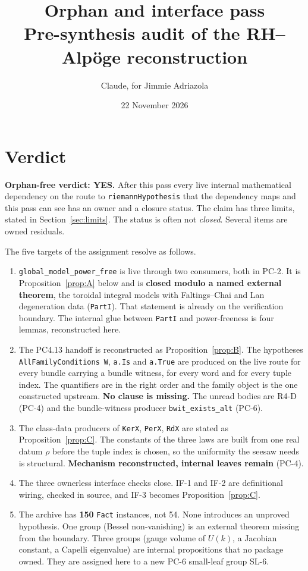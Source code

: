 \documentclass[11pt]{article}
\title{Orphan and interface pass\\[2pt]\large Pre-synthesis audit of the RH--Alpöge reconstruction}
\author{Claude, for Jimmie Adriazola}
\date{22 November 2026}
\newcommand{\lean}[1]{\nolinkurl{#1}}
\newcommand{\PC}[1]{PC-#1}
\theoremstyle{remark}
\begin{document}
\maketitle

\section{Verdict}

\textbf{Orphan-free verdict: YES.} After this pass every live internal mathematical dependency on the route to \lean{riemannHypothesis} that the dependency maps and this pass can see has an owner and a closure status. The claim has three limits, stated in Section~\ref{sec:limits}. The status is often not \emph{closed}. Several items are owned residuals.

The five targets of the assignment resolve as follows.
\begin{enumerate}
\item \lean{global_model_power_free} is live through two consumers, both in \PC{2}. It is Proposition~\ref{prop:A} below and is \textbf{closed modulo a named external theorem}, the toroidal integral models with Faltings--Chai and Lan degeneration data (\lean{PartI}). That statement is already on the verification boundary. The internal glue between \lean{PartI} and power-freeness is four lemmas, reconstructed here.
\item The PC4.13 handoff is reconstructed as Proposition~\ref{prop:B}. The hypotheses \lean{AllFamilyConditions}~\lean{W}, \lean{a.Is} and \lean{a.True} are produced on the live route for every bundle carrying a bundle witness, for every word and for every tuple index. The quantifiers are in the right order and the family object is the one constructed upstream. \textbf{No clause is missing.} The unread bodies are R4-D (\PC{4}) and the bundle-witness producer \lean{bwit_exists_alt} (\PC{6}).
\item The class-data producers of \lean{KerX}, \lean{PerX}, \lean{RdX} are stated as Proposition~\ref{prop:C}. The constants of the three laws are built from one real datum $\rho$ before the tuple index is chosen, so the uniformity the seesaw needs is structural. \textbf{Mechanism reconstructed, internal leaves remain} (\PC{4}).
\item The three ownerless interface checks close. IF-1 and IF-2 are definitional wiring, checked in source, and IF-3 becomes Proposition~\ref{prop:C}.
\item The archive has \textbf{150} \lean{Fact} instances, not 54. None introduces an unproved hypothesis. One group (Bessel non-vanishing) is an external theorem missing from the boundary. Three groups (gauge volume of $U(k)$, a Jacobian constant, a Capelli eigenvalue) are internal propositions that no package owned. They are assigned here to a new \PC{6} small-leaf group SL-6.
\end{enumerate}
\end{document}
